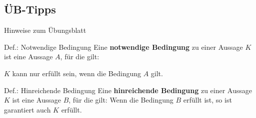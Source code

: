 \subsection{ÜB-Tipps}
\begin{frame}{Hinweise zum Übungsblatt}
	\begin{block}{Def.: Notwendige Bedingung}
		Eine \textbf{notwendige Bedingung} zu einer Aussage $K$ ist eine Aussage $A$, für die gilt:

		\center $K$ kann nur erfüllt sein, wenn die Bedingung $A$ gilt.
	\end{block}

	\begin{block}{Def.: Hinreichende Bedingung}
		Eine \textbf{hinreichende Bedingung} zu einer Aussage $K$ ist eine Aussage $B$, für die gilt:
		\center Wenn die Bedingung $B$ erfüllt ist, so ist garantiert auch $K$ erfüllt.
	\end{block}

	
\end{frame}